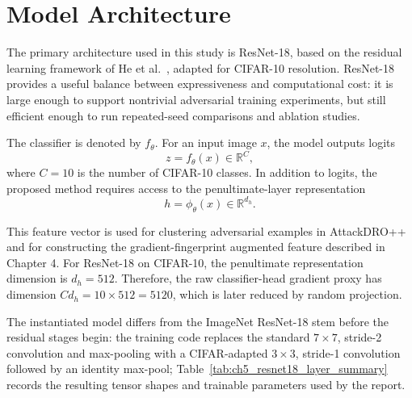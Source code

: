 ﻿\section{Model Architecture}

The primary architecture used in this study is ResNet-18, based on the residual learning
framework of He et al.~\cite{he2016deep}, adapted for CIFAR-10 resolution. ResNet-18
provides a useful balance between expressiveness and computational cost: it is large
enough to support nontrivial adversarial training experiments, but still efficient enough
to run repeated-seed comparisons and ablation studies.

The classifier is denoted by \(f_\theta\). For an input image \(x\), the model outputs logits
$$
z = f_\theta(x) \in \mathbb{R}^{C},
$$
where \(C=10\) is the number of CIFAR-10 classes. In addition to logits, the proposed method requires access to the penultimate-layer representation
$$
h = \phi_\theta(x) \in \mathbb{R}^{d_h}.
$$

This feature vector is used for clustering adversarial examples in AttackDRO++ and for constructing the gradient-fingerprint augmented feature described in Chapter 4. For ResNet-18 on CIFAR-10, the penultimate representation dimension is \(d_h = 512\). Therefore, the raw classifier-head gradient proxy has dimension \(C d_h = 10 \times 512 = 5120\), which is later reduced by random projection.

The instantiated model differs from the ImageNet ResNet-18 stem before the residual stages begin: the training code replaces the standard \(7{\times}7\), stride-2 convolution and max-pooling with a CIFAR-adapted \(3{\times}3\), stride-1 convolution followed by an identity max-pool; Table~\ref{tab:ch5_resnet18_layer_summary} records the resulting tensor shapes and trainable parameters used by the report.


